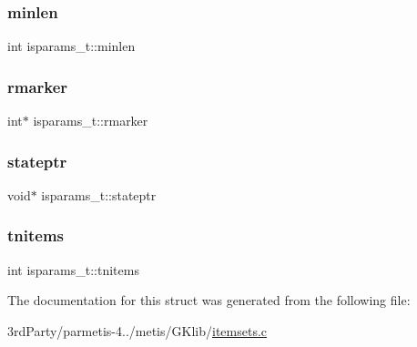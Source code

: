 \mbox{\label{structisparams__t_a544a1225743a310e8dc7f75a9338cae8}} 
\subsubsection{\texorpdfstring{minlen}{minlen}}
{\footnotesize\ttfamily int isparams\+\_\+t\+::minlen}

\mbox{\label{structisparams__t_ae83e2391121d3113b67ddd02c868eb6c}} 
\subsubsection{\texorpdfstring{rmarker}{rmarker}}
{\footnotesize\ttfamily int$\ast$ isparams\+\_\+t\+::rmarker}

\mbox{\label{structisparams__t_a11588df8c18be6e4a5721d68d917b2a7}} 
\subsubsection{\texorpdfstring{stateptr}{stateptr}}
{\footnotesize\ttfamily void$\ast$ isparams\+\_\+t\+::stateptr}

\mbox{\label{structisparams__t_aa8d4c3fc130ae48f825e6787f91817df}} 
\subsubsection{\texorpdfstring{tnitems}{tnitems}}
{\footnotesize\ttfamily int isparams\+\_\+t\+::tnitems}



The documentation for this struct was generated from the following file\+:\begin{DoxyCompactItemize}
\item 
3rd\+Party/parmetis-\/4../metis/\+G\+Klib/\hyperlink{itemsets_8c}{itemsets.\+c}\end{DoxyCompactItemize}
